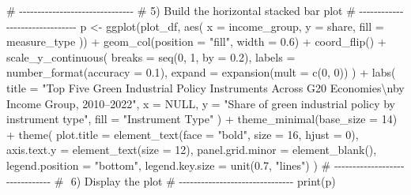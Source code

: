 \documentclass[
  letterpaper,
  DIV=11,
  numbers=noendperiod]{scrartcl}
\newenvironment{Shaded}{\begin{snugshade}}{\end{snugshade}}
\newcommand{\AttributeTok}[1]{\textcolor[rgb]{0.40,0.45,0.13}{#1}}
\newcommand{\CommentTok}[1]{\textcolor[rgb]{0.37,0.37,0.37}{#1}}
\newcommand{\ConstantTok}[1]{\textcolor[rgb]{0.56,0.35,0.01}{#1}}
\newcommand{\DecValTok}[1]{\textcolor[rgb]{0.68,0.00,0.00}{#1}}
\newcommand{\FloatTok}[1]{\textcolor[rgb]{0.68,0.00,0.00}{#1}}
\newcommand{\FunctionTok}[1]{\textcolor[rgb]{0.28,0.35,0.67}{#1}}
\newcommand{\NormalTok}[1]{\textcolor[rgb]{0.00,0.23,0.31}{#1}}
\newcommand{\OtherTok}[1]{\textcolor[rgb]{0.00,0.23,0.31}{#1}}
\newcommand{\SpecialCharTok}[1]{\textcolor[rgb]{0.37,0.37,0.37}{#1}}
\newcommand{\StringTok}[1]{\textcolor[rgb]{0.13,0.47,0.30}{#1}}
\begin{document}
\begin{Shaded}
\begin{Highlighting}[]
\CommentTok{\# {-}{-}{-}{-}{-}{-}{-}{-}{-}{-}{-}{-}{-}{-}{-}{-}{-}{-}{-}{-}{-}{-}{-}{-}{-}{-}{-}{-}{-}{-}{-}}
\CommentTok{\#  5) Build the horizontal stacked bar plot}
\CommentTok{\# {-}{-}{-}{-}{-}{-}{-}{-}{-}{-}{-}{-}{-}{-}{-}{-}{-}{-}{-}{-}{-}{-}{-}{-}{-}{-}{-}{-}{-}{-}{-}}
\NormalTok{p }\OtherTok{\textless{}{-}} \FunctionTok{ggplot}\NormalTok{(plot\_df, }\FunctionTok{aes}\NormalTok{(}
    \AttributeTok{x =}\NormalTok{ income\_group,}
    \AttributeTok{y =}\NormalTok{ share,}
    \AttributeTok{fill =}\NormalTok{ measure\_type}
\NormalTok{  )) }\SpecialCharTok{+}
  \FunctionTok{geom\_col}\NormalTok{(}\AttributeTok{position =} \StringTok{"fill"}\NormalTok{, }\AttributeTok{width =} \FloatTok{0.6}\NormalTok{) }\SpecialCharTok{+}
  \FunctionTok{coord\_flip}\NormalTok{() }\SpecialCharTok{+}
  \FunctionTok{scale\_y\_continuous}\NormalTok{(}
    \AttributeTok{breaks =} \FunctionTok{seq}\NormalTok{(}\DecValTok{0}\NormalTok{, }\DecValTok{1}\NormalTok{, }\AttributeTok{by =} \FloatTok{0.2}\NormalTok{),}
    \AttributeTok{labels =} \FunctionTok{number\_format}\NormalTok{(}\AttributeTok{accuracy =} \FloatTok{0.1}\NormalTok{),}
    \AttributeTok{expand =} \FunctionTok{expansion}\NormalTok{(}\AttributeTok{mult =} \FunctionTok{c}\NormalTok{(}\DecValTok{0}\NormalTok{, }\DecValTok{0}\NormalTok{))}
\NormalTok{  ) }\SpecialCharTok{+}
  \FunctionTok{labs}\NormalTok{(}
    \AttributeTok{title =} \StringTok{"Top Five Green Industrial Policy Instruments Across G20 Economies}\SpecialCharTok{\textbackslash{}n}\StringTok{by Income Group, 2010–2022"}\NormalTok{,}
    \AttributeTok{x =} \ConstantTok{NULL}\NormalTok{,}
    \AttributeTok{y =} \StringTok{"Share of green industrial policy by instrument type"}\NormalTok{,}
    \AttributeTok{fill =} \StringTok{"Instrument Type"}
\NormalTok{  ) }\SpecialCharTok{+}
  \FunctionTok{theme\_minimal}\NormalTok{(}\AttributeTok{base\_size =} \DecValTok{14}\NormalTok{) }\SpecialCharTok{+}
  \FunctionTok{theme}\NormalTok{(}
    \AttributeTok{plot.title      =} \FunctionTok{element\_text}\NormalTok{(}\AttributeTok{face =} \StringTok{"bold"}\NormalTok{, }\AttributeTok{size =} \DecValTok{16}\NormalTok{, }\AttributeTok{hjust =} \DecValTok{0}\NormalTok{),}
    \AttributeTok{axis.text.y     =} \FunctionTok{element\_text}\NormalTok{(}\AttributeTok{size =} \DecValTok{12}\NormalTok{),}
    \AttributeTok{panel.grid.minor =} \FunctionTok{element\_blank}\NormalTok{(),}
    \AttributeTok{legend.position =} \StringTok{"bottom"}\NormalTok{,}
    \AttributeTok{legend.key.size =} \FunctionTok{unit}\NormalTok{(}\FloatTok{0.7}\NormalTok{, }\StringTok{"lines"}\NormalTok{)}
\NormalTok{  )}
\CommentTok{\# {-}{-}{-}{-}{-}{-}{-}{-}{-}{-}{-}{-}{-}{-}{-}{-}{-}{-}{-}{-}{-}{-}{-}{-}{-}{-}{-}{-}{-}{-}{-}}
\CommentTok{\# ️ 6) Display the plot}
\CommentTok{\# {-}{-}{-}{-}{-}{-}{-}{-}{-}{-}{-}{-}{-}{-}{-}{-}{-}{-}{-}{-}{-}{-}{-}{-}{-}{-}{-}{-}{-}{-}{-}}
\FunctionTok{print}\NormalTok{(p)}
\end{Highlighting}
\end{Shaded}
\end{document}
